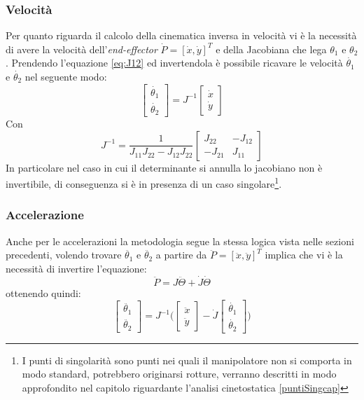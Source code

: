 \subsubsection{Velocità}
Per quanto riguarda il calcolo della cinematica inversa in velocità vi è la necessità di avere la  velocità dell'\textit{end-effector}  $\dot{P} = [\dot{x},\dot{y}]^T$ e della Jacobiana che lega $\theta_1$ e $\theta_2$. Prendendo l'equazione \ref{eq:J12} ed invertendola è possibile ricavare le velocità $\dot{\theta_1}$ e $\dot{\theta_2}$ nel seguente modo:
\begin{equation}
   \begin{bmatrix} \dot{\theta_1} \\ \dot{\theta_2}  \end{bmatrix} 
    = J^{-1} \begin{bmatrix} \dot{x} \\ \dot{y} \end{bmatrix}
\end{equation}
Con
\begin{equation}
	J^{-1} = \frac{1}{J_{11}J_{22}-J_{12}J_{22}
	}\begin{bmatrix}
		J_{22} & -J_{12} \\ -J_{21} & J_{11}
\end{bmatrix}
\end{equation} 
In particolare nel caso in cui il determinante si annulla lo jacobiano non è invertibile, di conseguenza si è in presenza di un caso singolare\footnote{I punti di singolarità sono punti nei quali il manipolatore non si comporta in modo standard, potrebbero originarsi rotture, verranno descritti in modo approfondito nel capitolo riguardante l'analisi cinetostatica \ref{puntiSingcap}}.
\subsubsection{Accelerazione}
Anche per le accelerazioni la metodologia segue la stessa logica vista nelle sezioni precedenti, volendo trovare $\ddot{\theta_1}$ e $\ddot{\theta_2}$ a partire da $\ddot{P} = [\ddot{x},\ddot{y}]^T$ implica che vi è la necessità di invertire l'equazione:
\begin{equation*}
	\ddot{P} = J\ddot{\Theta} + \dot{J}\dot{\Theta}
\end{equation*}
ottenendo quindi:
\begin{equation}
	\begin{bmatrix}
		\ddot{\theta_1} \\ \ddot{\theta_2}
	\end{bmatrix} =  J^{-1}\bigg(\begin{bmatrix} \ddot{x} \\ \ddot{y} \end{bmatrix}-\dot{J}\begin{bmatrix}
	\dot{\theta_1} \\ \dot{\theta_2}
\end{bmatrix}\bigg)
\end{equation}
